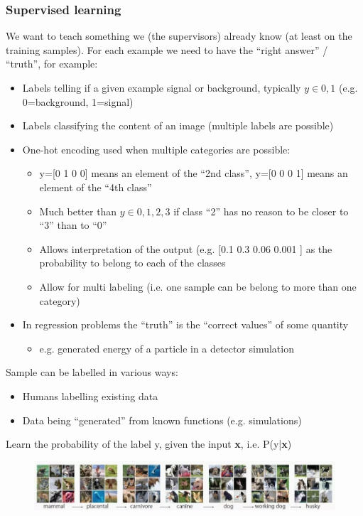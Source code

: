 \subsubsection{Supervised learning}

We want to teach something we (the supervisors) already know (at least on the training samples). For each example we need to have the “right answer” / “truth”, for example:

\begin{itemize}
	\item Labels telling if a given example signal or background, typically $y \in{0,1}$ (e.g. 0=background, 1=signal)
	\item Labels classifying the content of an image (multiple labels are possible)
	\item One-hot encoding used when multiple categories are possible:
		\begin{itemize}
			\item y=[0 1 0 0] means an element of the “2nd class”, y=[0 0 0 1] means an element of the “4th class”
			\item Much better than $y\in {0,1,2,3}$ if class “2” has no reason to be closer to “3” than to “0”
			\item Allows interpretation of the output (e.g. [0.1 0.3 0.06 0.001 ] as the probability to belong to each of the classes
			\item Allow for multi labeling (i.e. one sample can be belong to more than one category)
		\end{itemize}
	\item In regression problems the “truth” is the “correct values” of some quantity
		\begin{itemize}
			\item e.g. generated energy of a particle in a detector simulation
		\end{itemize}
\end{itemize}

Sample can be labelled in various ways:
\begin{itemize}
	\item Humans labelling existing data
	\item Data being “generated” from known functions (e.g. simulations)
\end{itemize}

Learn the probability of the label y, given the input \textbf{x}, i.e. P(y|\textbf{x})

\begin{figure}[ht]
	\centering
	\includegraphics[width=1\textwidth]{figure_ml/supervised_learning.png}
\end{figure}
\FloatBarrier

